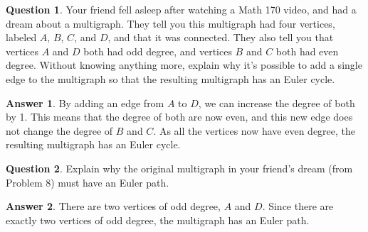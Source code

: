 \documentclass[article, 12pt]{article}
\theoremstyle{definition}
\newtheorem{question}{Question}
\newtheorem{answer}{Answer}
\begin{document}
    \begin{question}
        Your friend fell asleep after watching a Math 170 video, and had a dream about a multigraph. They tell you this multigraph had four vertices, labeled $A$, $B$, $C$, and $D$, and that it was connected. They also tell you that vertices $A$ and $D$ both had odd degree, and vertices $B$ and $C$ both had even degree. Without knowing anything more, explain why it's possible to add a single edge to the multigraph so that the resulting multigraph has an Euler cycle.
    \end{question}
    \begin{answer}
        By adding an edge from $A$ to $D$, we can increase the degree of both by 1. This means that the degree of both are now even, and this new edge does not change the degree of $B$ and $C$. As all the vertices now have even degree, the resulting multigraph has an Euler cycle.
    \end{answer}
    \begin{question}
        Explain why the original multigraph in your friend's dream (from Problem 8) must have
        an Euler path.        
    \end{question}
    \begin{answer}
        There are two vertices of odd degree, $A$ and $D$. Since there are exactly two vertices of odd degree, the multigraph has an Euler path.
    \end{answer}
\end{document}
